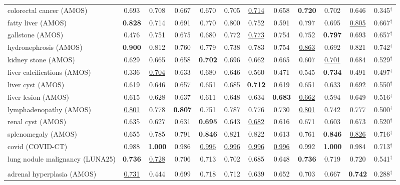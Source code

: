 \begin{minipage}{\textwidth}
{\begin{tabular}{@{}lccccccccccc@{}}
colorectal cancer (AMOS) & 0.693 & 0.708 & 0.667 & 0.670 & 0.705 & \underline{0.714} & 0.658 & \textbf{0.720} & 0.702 & 0.646 & 0.345$^{\dagger}$ \\
fatty liver (AMOS) & \textbf{0.828} & 0.714 & 0.691 & 0.770 & 0.800 & 0.752 & 0.591 & 0.797 & 0.695 & \underline{0.805} & 0.667$^{\dagger}$ \\
gallstone (AMOS) & 0.476 & 0.751 & 0.675 & 0.680 & 0.772 & \underline{0.773} & 0.754 & 0.752 & \textbf{0.797} & 0.693 & 0.657$^{\dagger}$ \\
hydronephrosis (AMOS) & \textbf{0.900} & 0.812 & 0.760 & 0.779 & 0.738 & 0.783 & 0.754 & \underline{0.863} & 0.692 & 0.821 & 0.742$^{\dagger}$ \\
kidney stone (AMOS) & 0.629 & 0.665 & 0.658 & \textbf{0.702} & 0.696 & 0.662 & 0.665 & 0.607 & \underline{0.701} & 0.684 & 0.529$^{\dagger}$ \\
liver calcifications (AMOS) & 0.336 & \underline{0.704} & 0.633 & 0.680 & 0.646 & 0.560 & 0.471 & 0.545 & \textbf{0.734} & 0.491 & 0.497$^{\dagger}$ \\
liver cyst (AMOS) & 0.619 & 0.646 & 0.657 & 0.651 & 0.685 & \textbf{0.712} & 0.619 & 0.651 & 0.633 & \underline{0.692} & 0.550$^{\dagger}$ \\
liver lesion (AMOS) & 0.615 & 0.628 & 0.637 & 0.611 & 0.648 & 0.634 & \textbf{0.683} & \underline{0.662} & 0.594 & 0.649 & 0.516$^{\dagger}$ \\
lymphadenopathy (AMOS) & \underline{0.801} & 0.778 & \textbf{0.807} & 0.751 & 0.787 & 0.776 & 0.730 & \underline{0.801} & 0.742 & 0.777 & 0.500$^{\dagger}$ \\
renal cyst (AMOS) & 0.635 & 0.627 & 0.631 & \textbf{0.695} & 0.643 & \underline{0.682} & 0.616 & 0.671 & 0.603 & 0.673 & 0.520$^{\dagger}$ \\
splenomegaly (AMOS) & 0.655 & 0.785 & 0.791 & \textbf{0.846} & 0.821 & 0.822 & 0.613 & 0.761 & \textbf{0.846} & \underline{0.826} & 0.716$^{\dagger}$ \\
covid (COVID-CT) & 0.988 & \textbf{1.000} & 0.986 & \underline{0.996} & \underline{0.996} & \underline{0.996} & \underline{0.996} & 0.992 & \textbf{1.000} & 0.984 & 0.713$^{\dagger}$ \\
lung nodule malignancy (LUNA25) & \textbf{0.736} & \underline{0.728} & 0.706 & 0.713 & 0.702 & 0.685 & 0.648 & \textbf{0.736} & 0.719 & 0.720 & 0.541$^{\dagger}$ \\
\addlinespace
\multicolumn{12}{@{}l}{\textit{joint (26\,000 steps)}} \\
adrenal hyperplasia (AMOS) & \underline{0.731} & 0.444 & 0.699 & 0.718 & 0.712 & 0.639 & 0.652 & 0.703 & 0.667 & \textbf{0.742} & 0.288$^{\dagger}$ \\

\end{tabular}}
\end{minipage}
